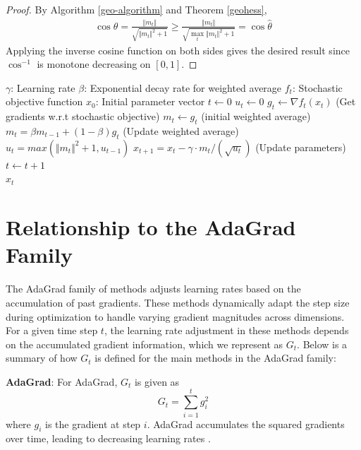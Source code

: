 \documentclass{article}
\begin{document}
\begin{proof}
 By Algorithm \ref{geo-algorithm} and Theorem \ref{geohess},
 \begin{align*}
\cos \theta = \frac{\Vert m_t \Vert}{\sqrt{\Vert m_t \Vert^2 + 1}} 
\ge \frac{\Vert m_t \Vert}{\sqrt{\underset{t}{\max} \Vert m_t \Vert^2 + 1}}
= \cos \hat{\theta}
 \end{align*}
 Applying the inverse cosine function on both sides gives the desired result since $\cos^{-1}$ is monotone decreasing on $[0,1]$.
\end{proof}

\begin{algorithm} 
\caption{GeoAdaMax}
\label{geomax-algorithm}
\begin{algorithmic}
\Require $\gamma$: Learning rate
\Require $\beta$: Exponential decay rate for weighted average
\Require $f_t$: Stochastic objective function
\Require $x_0$: Initial parameter vector
\State $t \gets 0$
\State $u_t \gets 0$
\State $g_t \gets \nabla f_t(x_t)$ (Get gradients w.r.t stochastic objective)
\State $m_t \gets g_t$ (initial weighted average)
\Else
\State $m_t=\beta m_{t-1} +(1-\beta)g_t$ (Update weighted average)
\EndIf
\State $u_t=max(\Vert m_{t}\Vert^2+1,u_{t-1})$
\State $x_{t+1}=x_t-\gamma \cdot m_{t}/(\sqrt{u_t})$ (Update parameters)
\State $t \gets t+1$
\EndWhile\\
\Return $x_t$ 
\end{algorithmic}
\end{algorithm}


\section{Relationship to the AdaGrad Family}

The AdaGrad family of methods adjusts learning rates based on the accumulation of past gradients. These methods dynamically adapt the step size during optimization to handle varying gradient magnitudes across dimensions.
For a given time step $t$, the learning rate adjustment in these methods depends on the accumulated gradient information, which we represent as $G_t$. Below is a summary of how $G_t$ is defined for the main methods in the AdaGrad family:

\textbf{AdaGrad}: For AdaGrad, $G_t$ is given as
    \[
    G_t = \sum_{i=1}^t g_i^2
    \]
    where $g_i$ is the gradient at step $i$. AdaGrad accumulates the squared gradients over time, leading to decreasing learning rates \citep{duchi2011adaptive}.
    
\end{document}
